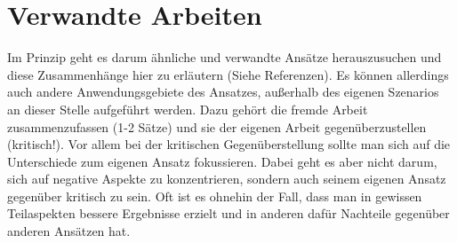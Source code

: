 
\chapter{Verwandte Arbeiten}\label{chapter:related-work}

Im Prinzip geht es darum ähnliche und verwandte Ansätze herauszusuchen und diese Zusammenhänge hier zu erläutern (Siehe Referenzen). Es können allerdings auch andere Anwendungsgebiete des Ansatzes, außerhalb des eigenen Szenarios an dieser Stelle aufgeführt werden.
Dazu gehört die fremde Arbeit zusammenzufassen (1-2 Sätze) und sie der eigenen Arbeit gegenüberzustellen (kritisch!).
Vor allem bei der kritischen Gegenüberstellung sollte man sich auf die Unterschiede zum eigenen Ansatz fokussieren.
Dabei geht es aber nicht darum, sich auf negative Aspekte zu konzentrieren, sondern auch seinem eigenen Ansatz gegenüber kritisch zu sein.
Oft ist es ohnehin der Fall, dass man in gewissen Teilaspekten bessere Ergebnisse erzielt und in anderen dafür Nachteile gegenüber anderen Ansätzen hat.